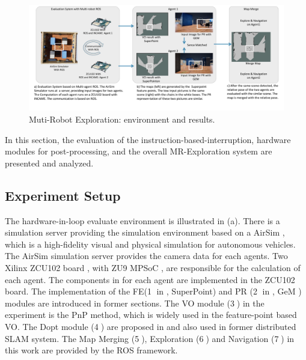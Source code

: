 \label{sec:experiments}


\begin{figure}[t]
  \centering
  \vspace{-0.1cm} 
  \setlength{\abovecaptionskip}{0cm} 
  \setlength{\belowcaptionskip}{-0.05cm} 
  \includegraphics[width=0.99\linewidth]{fig/env.pdf}
  \caption{Muti-Robot Exploration: environment and results. }
  \label{fig:env}
\end{figure}

In this section, the evaluation of the instruction-based-interruption, hardware modules for post-processing, and the overall MR-Exploration system are presented and analyzed.

\subsection{ Experiment Setup }

The hardware-in-loop evaluate environment is illustrated in (a). There is a simulation server providing the simulation environment based on a AirSim \cite{shah2018airsim}, which is a high-fidelity visual and physical simulation for autonomous vehicles. The AirSim simulation server provides the camera data for each agents. Two Xilinx ZCU102 board \cite{zcu102}, with ZU9 MPSoC \cite{MPSoC}, are responsible for the calculation of each agent. 
The components in  for each agent are implemented in the ZCU102 board. The implementation of the FE(\textcircled{1} in , SuperPoint\cite{detone2018superpoint}) and PR (\textcircled{2} in , GeM \cite{radenovic2018fine}) modules are introduced in former sections. 
The VO module (\textcircled{3}) in the experiment is the PnP \cite{LepetitMoreno-Noguer-EPnP} method, which is widely used in the feature-point based VO. 
The Dopt module (\textcircled{4}) are proposed in \cite{Choudhary:2017e66} and also used in former distributed SLAM system\cite{cieslewski2018data}. 
The Map Merging \cite{Andre2014} (\textcircled{5}), Exploration \cite{8202319} (\textcircled{6}) and Navigation \cite{tbd} (\textcircled{7}) in this work are provided by the ROS framework. 

